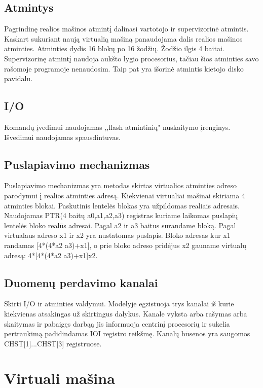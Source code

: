 \documentclass[oneside]{VUMIFPSkursinis}
\begin{document}
\subsection{Atmintys}
Pagrindinę realios mašinos atmintį dalinasi vartotojo ir supervizorinė atmintis. Kaskart sukuriant naują virtualią mašiną panaudojama dalis realios mašinos atminties. Atminties dydis 16 blokų po 16 žodžių. Žodžio ilgis 4 baitai. Supervizorinę atmintį naudoja aukšto lygio procesorius, tačiau šios atminties savo rašomoje programoje nenaudosim. Taip pat yra išorinė atmintis kietojo disko pavidalu.

\subsection{I/O}
Komandų įvedimui naudojamas ,,flash atmintinių" nuskaitymo įrenginys. Išvedimui naudojamas spausdintuvas.

\subsection{Puslapiavimo mechanizmas}
Puslapiavimo mechanizmas yra metodas skirtas virtualios atminties adreso parodymui į realios atminties adresą. Kiekvienai virtualiai mašinai skiriama 4 atminties blokai. Paskutinis lentelės blokas yra užpildomas realiais adresais. Naudojamas PTR(4 baitų a0,a1,a2,a3) registras kuriame laikomas puslapių lentelės bloko realūs adresai. Pagal a2 ir a3 baitus surandame bloką. Pagal virtualaus adreso x1 ir x2 yra nustatomas puslapis. Bloko adresas kur x1 randamas [4*(4*a2 a3)+x1], o prie bloko adreso pridėjus x2 gauname virtualų adresą: 4*[4*(4*a2 a3)+x1]x2.

\subsection{Duomenų perdavimo kanalai}
Skirti I/O ir atminties valdymui. Modelyje egzistuoja trys kanalai iš kurie kiekvienas atsakingas už skirtingus dalykus. Kanale vyksta arba rašymas arba skaitymas ir pabaigęs darbąą jis informuoja centrinį procesorių ir sukelia pertraukimą padidindamas IOI registro reikšmę. Kanalų būsenos yra saugomos CHST[1]...CHST[3] registruose.





\section{Virtuali mašina}
\end{document}
